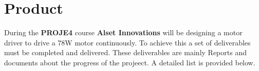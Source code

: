 \section{Product}


During the \textbf{PROJE4} course \textbf{Alset Innovations} will be designing a motor driver to drive a 78W motor continuously. To achieve this a set of deliverables must be completed and delivered. These deliverables are mainly Reports and documents about the progress of the projeect. A detailed list is provided below.

